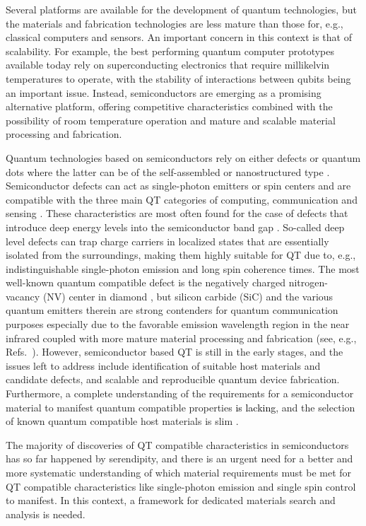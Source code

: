 \documentclass[superscriptaddress,unsortedaddress,
 amsmath,amssymb,
 aps,
]{revtex4-2}
\newcommand{\mrk}[1]{\textcolor{black}{#1}}
\begin{document}
Several platforms are available for the development of quantum technologies, but the materials and fabrication technologies are less mature than those for, e.g., classical computers and sensors. 
An important concern in this context is that of scalability. 
For example, the best performing quantum computer prototypes available today rely on superconducting electronics that require millikelvin temperatures to operate, with the stability of interactions between qubits being an important issue. Instead, semiconductors are emerging as a promising alternative platform, offering competitive characteristics combined with the possibility of room temperature operation and mature and scalable material processing and fabrication.  

Quantum technologies based on semiconductors rely on either defects or quantum dots where the latter can be of the self-assembled or nanostructured type \cite{Aharonovich_2016}. 
Semiconductor defects can act as single-photon emitters or spin centers and are compatible with the three main QT categories of computing, communication and sensing \cite{Awschalom_2018}. 
These characteristics are most often found for the case of defects that introduce deep energy levels into the semiconductor band gap \cite{Weber2010}. So-called deep level defects can trap charge carriers in localized states that are essentially isolated from the surroundings, making them highly suitable for QT due to, e.g., indistinguishable single-photon emission and long spin coherence times. 
The most well-known quantum compatible defect is the negatively charged nitrogen-vacancy (NV) center in diamond \cite{Doherty_2013}, but silicon carbide (SiC) and the various quantum emitters therein are strong contenders for quantum communication purposes especially due to the favorable emission wavelength region in the near infrared coupled with more mature material processing and fabrication (see, e.g., Refs.~\cite{Castelletto_2015,Son2020,Bathen2021}). However, semiconductor based QT is still in the early stages, and the issues left to address include identification of suitable host materials and candidate defects, and scalable and reproducible quantum device fabrication. 
Furthermore, a complete understanding of the requirements for a semiconductor material to manifest quantum compatible properties \mrk{is lacking},  
and the selection of known quantum compatible host materials is slim \cite{Atatuere2018,Zhang2020}. 

The majority of discoveries of QT compatible characteristics in semiconductors has so far happened by serendipity, and there is an urgent need for a better and more systematic understanding of which material requirements must be met for QT compatible characteristics like single-photon emission and single spin control to manifest. In this context, a framework for dedicated materials search and analysis is needed. 
\end{document}

